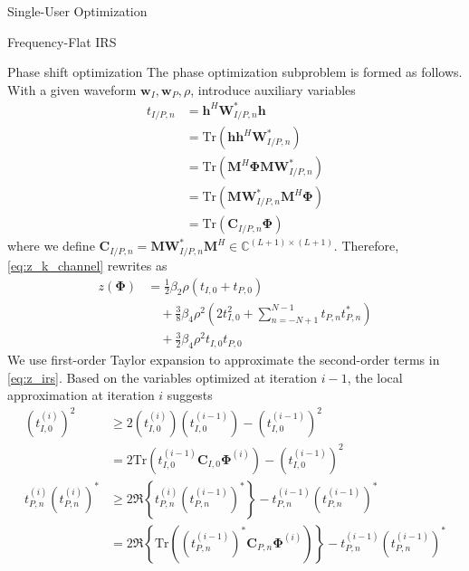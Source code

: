 \documentclass{IEEEtran}
\begin{document}
\begin{section}{Single-User Optimization}
\begin{subsection}{Frequency-Flat IRS}
		\begin{subsubsection}{Phase shift optimization}\label{se:fs_irs}
			The phase optimization subproblem is formed as follows. With a given waveform $\boldsymbol{w}_I,\boldsymbol{w}_P,\rho$, introduce auxiliary variables
			\begin{equation}\label{eq:t}
				\begin{split}
					t_{I/P,n}
					&=\boldsymbol{h}^H\boldsymbol{W}_{I/P,n}^*\boldsymbol{h}\\
					&=\mathrm{Tr}(\boldsymbol{h}\boldsymbol{h}^H\boldsymbol{W}_{I/P,n}^*)\\
					&=\mathrm{Tr}(\boldsymbol{M}^H\boldsymbol{\Phi}\boldsymbol{M}\boldsymbol{W}_{I/P,n}^*)\\
					&=\mathrm{Tr}(\boldsymbol{M}\boldsymbol{W}_{I/P,n}^*\boldsymbol{M}^H\boldsymbol{\Phi})\\
					&=\mathrm{Tr}(\boldsymbol{C}_{I/P,n}\boldsymbol{\Phi})
				\end{split}
			\end{equation}
			where we define $\boldsymbol{C}_{I/P,n}=\boldsymbol{M}\boldsymbol{W}_{I/P,n}^*\boldsymbol{M}^H \in \mathbb{C}^{(L+1)\times(L+1)}$. Therefore, \ref{eq:z_k_channel} rewrites as
			\begin{equation}\label{eq:z_irs}
				\begin{split}
					z(\boldsymbol{\Phi})
					&=\frac{1}{2}{\beta_2}{\rho}(t_{I,0}+t_{P,0})\\
					&\quad+\frac{3}{8}{\beta_4}{\rho^2} \left(2t_{I,0}^2 + \sum_{n=-N+1}^{N-1}{t_{P,n}t_{P,n}^*}\right)\\
					&\quad+\frac{3}{2}{\beta_4}{\rho^2}t_{I,0}t_{P,0}
				\end{split}
			\end{equation}
			We use first-order Taylor expansion to approximate the second-order terms in \ref{eq:z_irs}. Based on the variables optimized at iteration $i - 1$, the local approximation at iteration $i$ suggests \cite{Adali2010}
			\begin{align}
				(t_{I,0}^{(i)})^2
				& \ge 2 (t_{I,0}^{(i)})(t_{I,0}^{(i-1)}) - (t_{I,0}^{(i-1)})^2\nonumber\\
				& = 2 \mathrm{Tr}(t_{I,0}^{(i-1)}\boldsymbol{C}_{I,0}\boldsymbol{\Phi}^{(i)}) - (t_{I,0}^{(i-1)})^2\label{eq:t_approx_begin}\\
				t_{P,n}^{(i)} (t_{P,n}^{(i)})^*
				& \ge 2 \Re\left\{t_{P,n}^{(i)} (t_{P,n}^{(i-1)})^*\right\} - t_{P,n}^{(i-1)} (t_{P,n}^{(i-1)})^*\nonumber\\
				& = 2 \Re \left\{\mathrm{Tr}\left((t_{P,n}^{(i-1)})^*\boldsymbol{C}_{P,n}\boldsymbol{\Phi}^{(i)}\right)\right\} - t_{P,n}^{(i-1)} (t_{P,n}^{(i-1)})^*\nonumber\\

\end{align}
\end{subsubsection}
\end{subsection}
\end{section}
\end{document}
